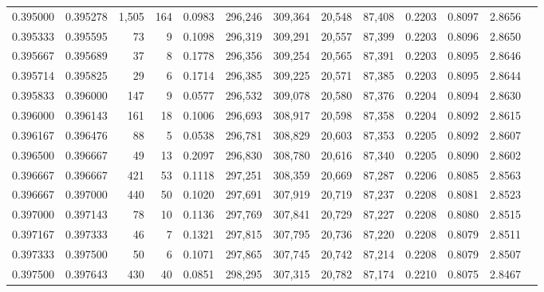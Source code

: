 \begin{tabular}{rrrrrrrrrrrrr}
0.395000 & 0.395278 & 1,505 & 164 &                                     0.0983 & 296,246 & 309,364 &  20,548 &  87,408 & 0.2203 & 0.8097 & 2.8656 \\
0.395333 & 0.395595 &    73 &   9 &                                     0.1098 & 296,319 & 309,291 &  20,557 &  87,399 & 0.2203 & 0.8096 & 2.8650 \\
0.395667 & 0.395689 &    37 &   8 &                                     0.1778 & 296,356 & 309,254 &  20,565 &  87,391 & 0.2203 & 0.8095 & 2.8646 \\
0.395714 & 0.395825 &    29 &   6 &                                     0.1714 & 296,385 & 309,225 &  20,571 &  87,385 & 0.2203 & 0.8095 & 2.8644 \\
0.395833 & 0.396000 &   147 &   9 &                                     0.0577 & 296,532 & 309,078 &  20,580 &  87,376 & 0.2204 & 0.8094 & 2.8630 \\
0.396000 & 0.396143 &   161 &  18 &                                     0.1006 & 296,693 & 308,917 &  20,598 &  87,358 & 0.2204 & 0.8092 & 2.8615 \\
0.396167 & 0.396476 &    88 &   5 &                                     0.0538 & 296,781 & 308,829 &  20,603 &  87,353 & 0.2205 & 0.8092 & 2.8607 \\
0.396500 & 0.396667 &    49 &  13 &                                     0.2097 & 296,830 & 308,780 &  20,616 &  87,340 & 0.2205 & 0.8090 & 2.8602 \\
0.396667 & 0.396667 &   421 &  53 &                                     0.1118 & 297,251 & 308,359 &  20,669 &  87,287 & 0.2206 & 0.8085 & 2.8563 \\
0.396667 & 0.397000 &   440 &  50 &                                     0.1020 & 297,691 & 307,919 &  20,719 &  87,237 & 0.2208 & 0.8081 & 2.8523 \\
0.397000 & 0.397143 &    78 &  10 &                                     0.1136 & 297,769 & 307,841 &  20,729 &  87,227 & 0.2208 & 0.8080 & 2.8515 \\
0.397167 & 0.397333 &    46 &   7 &                                     0.1321 & 297,815 & 307,795 &  20,736 &  87,220 & 0.2208 & 0.8079 & 2.8511 \\
0.397333 & 0.397500 &    50 &   6 &                                     0.1071 & 297,865 & 307,745 &  20,742 &  87,214 & 0.2208 & 0.8079 & 2.8507 \\
0.397500 & 0.397643 &   430 &  40 &                                     0.0851 & 298,295 & 307,315 &  20,782 &  87,174 & 0.2210 & 0.8075 & 2.8467 \\

\end{tabular}
